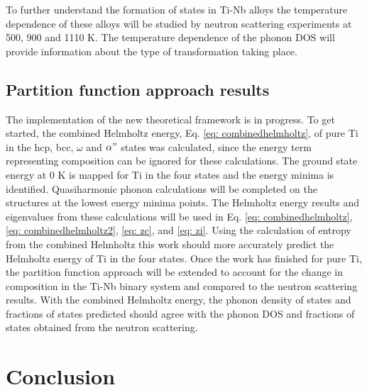 To further understand the formation of states in Ti-Nb alloys the temperature dependence of these alloys will be studied by neutron scattering experiments at 500, 900 and 1110 K. The temperature dependence of the phonon DOS will provide information about the type of transformation taking place.

\subsection{Partition function approach results}

The implementation of the new theoretical framework is in progress. To get started, the combined Helmholtz energy, Eq. \ref{eq: combinedhelmholtz}, of pure Ti in the hcp, bcc, $\omega$ and $\alpha"$ states was calculated, since the energy term representing composition can be ignored for these calculations. The ground state energy at 0 K is mapped for Ti in the four states and the energy minima is identified. Quasiharmonic phonon calculations will be completed on the structures at the lowest energy minima points. The Helmholtz energy results and eigenvalues from these calculations will be used in Eq. \ref{eq: combinedhelmholtz}, \ref{eq: combinedhelmholtz2}, \ref{eq: zc}, and \ref{eq: zi}. Using the calculation of entropy from the combined Helmholtz this work should more accurately predict the Helmholtz energy of Ti in the four states. Once the work has finished for pure Ti, the partition function approach will be extended to account for the change in composition in the Ti-Nb binary system and compared to the neutron scattering results. With the combined Helmholtz energy, the phonon density of states and fractions of states predicted should agree with the phonon DOS and fractions of states obtained from the neutron scattering.

\section{Conclusion}

